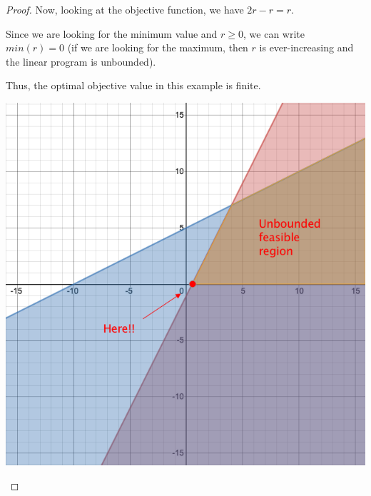 \documentclass[12pt]{article}
\begin{document}
\begin{enumerate}[1.]
\begin{proof}
    \bigskip

    Now, looking at the objective function, we have $2r - r = r$.

    \bigskip

    Since we are looking for the minimum value and $r \geq 0$, we can write $min(r) = 0$
    (if we are looking for the maximum, then $r$ is ever-increasing and the linear program is unbounded).

    \bigskip

    Thus, the optimal objective value in this example is finite.

    \bigskip

    \begin{center}
    \includegraphics[width=0.5\linewidth]{images/worksheet_6_solution_15.png}
    \end{center}

    \end{proof}










\end{enumerate}
\end{document}
